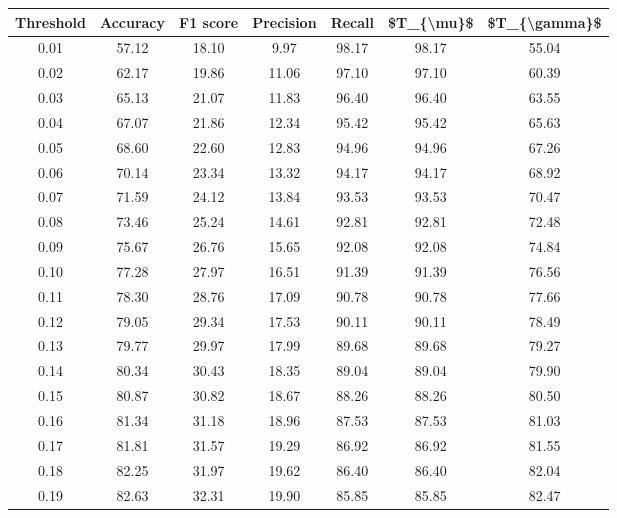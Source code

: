 \begin{tabular}{|c|c|c|c|c|c|c|}
\hline
 Threshold &  Accuracy &  F1 score &  Precision &  Recall &  \$T\_\{\textbackslash mu\}\$ &  \$T\_\{\textbackslash gamma\}\$ \\
\hline
      0.01 &     57.12 &     18.10 &       9.97 &   98.17 &      98.17 &         55.04 \\
      0.02 &     62.17 &     19.86 &      11.06 &   97.10 &      97.10 &         60.39 \\
      0.03 &     65.13 &     21.07 &      11.83 &   96.40 &      96.40 &         63.55 \\
      0.04 &     67.07 &     21.86 &      12.34 &   95.42 &      95.42 &         65.63 \\
      0.05 &     68.60 &     22.60 &      12.83 &   94.96 &      94.96 &         67.26 \\
      0.06 &     70.14 &     23.34 &      13.32 &   94.17 &      94.17 &         68.92 \\
      0.07 &     71.59 &     24.12 &      13.84 &   93.53 &      93.53 &         70.47 \\
      0.08 &     73.46 &     25.24 &      14.61 &   92.81 &      92.81 &         72.48 \\
      0.09 &     75.67 &     26.76 &      15.65 &   92.08 &      92.08 &         74.84 \\
      0.10 &     77.28 &     27.97 &      16.51 &   91.39 &      91.39 &         76.56 \\
      0.11 &     78.30 &     28.76 &      17.09 &   90.78 &      90.78 &         77.66 \\
      0.12 &     79.05 &     29.34 &      17.53 &   90.11 &      90.11 &         78.49 \\
      0.13 &     79.77 &     29.97 &      17.99 &   89.68 &      89.68 &         79.27 \\
      0.14 &     80.34 &     30.43 &      18.35 &   89.04 &      89.04 &         79.90 \\
      0.15 &     80.87 &     30.82 &      18.67 &   88.26 &      88.26 &         80.50 \\
      0.16 &     81.34 &     31.18 &      18.96 &   87.53 &      87.53 &         81.03 \\
      0.17 &     81.81 &     31.57 &      19.29 &   86.92 &      86.92 &         81.55 \\
      0.18 &     82.25 &     31.97 &      19.62 &   86.40 &      86.40 &         82.04 \\
      0.19 &     82.63 &     32.31 &      19.90 &   85.85 &      85.85 &         82.47 \\

\end{tabular}
